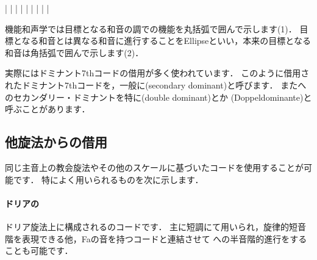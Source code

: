 \documentclass[dvipdfmx,uplatex,b5paper,openany,jbase=12Q,nomag*,textwidth-limit=44%
               ]{gachimuchi}[2020/05/05]
\begin{document}
\begin{Music}
  \generalmeter{\meterC}%
  \Startpiece%
  \NOTes%
  |%
  \en\bar%
  \NOTes%
  |%
  \en\bar%
  \NOTes%
  |%
  \en\bar%
  \NOTes%
  |%
  \en\bar%
  \NOTEs%
  |%
  \en\setdoublebar%
  \endpiece{}%
\end{Music}
\begin{NB}
  機能和声学では目標となる和音の調での機能を丸括弧で囲んで示します(1)．
  目標となる和音とは異なる和音に進行することをEllipseといい，本来の目標となる和音は角括弧で囲んで示します(2)．
\end{NB}

実際にはドミナント7thコードの借用が多く使われています．
このように借用されたドミナント7thコードを，一般に\jghost(secondary dominant)と呼びます．
また\Gnv へのセカンダリー・ドミナントを特に\jghost(double dominant)とか
\jghost(Doppeldominante)と呼ぶことがあります．

\subsection{他旋法からの借用}
同じ主音上の教会旋法やその他のスケールに基づいたコードを使用することが可能です．
特によく用いられるものを次に示します．

\paragraph{ドリアの\Gniv{}}
ドリア旋法上に構成される\Gniv{}のコードです．
主に短調にて用いられ，旋律的短音階を表現できる他，Faの音を持つコードと連結させて
\Gnv への半音階的進行をすることも可能です．
\end{document}
